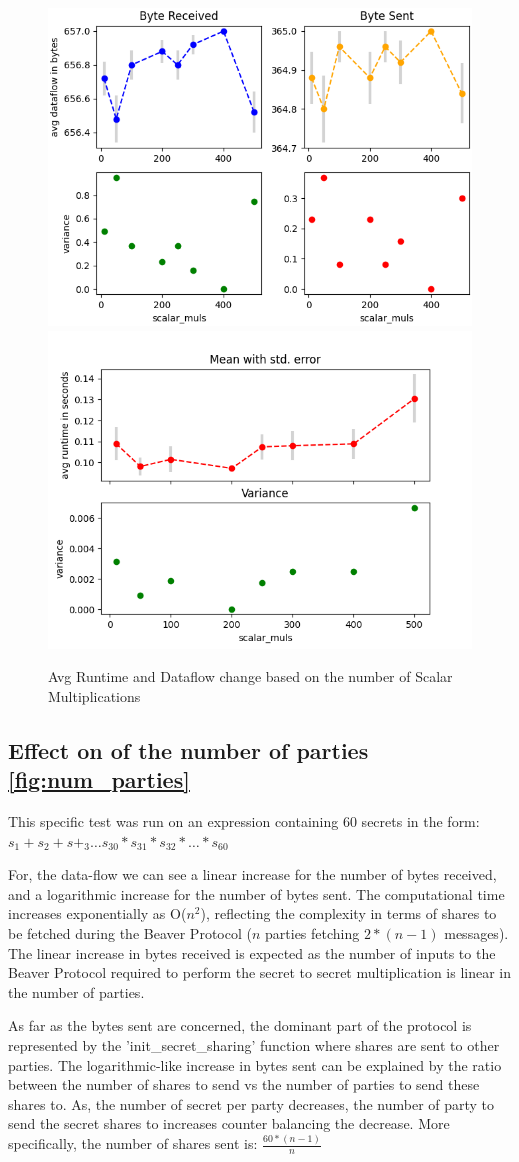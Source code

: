 \documentclass[10pt,conference,compsocconf]{IEEEtran}
\begin{document}
\begin{figure}[h!]
    \centering
    \includegraphics[width=0.49\linewidth]{../performance_analysis/dataflow_scalar_multiplications.png}
    \includegraphics[width=0.49\linewidth]{../performance_analysis/runtime_scalar_multiplications.png}
    \caption{Avg Runtime and Dataflow change based on the number of Scalar Multiplications}
    \label{fig:scalar_mult}
\end{figure}


\subsection{Effect on of the number of parties \ref{fig:num_parties}}
This specific test was run on an expression containing 60 secrets in the form: $s_1 + s_2 + s+_3 \dots s_{30} * s_{31} *
s_{32} * \dots*  s_{60}$

For, the data-flow we can see a linear increase for the number of bytes received, and a logarithmic increase for the
number of bytes sent.
The computational time increases exponentially as O($n^2$), reflecting the complexity in terms of shares to be fetched during the Beaver Protocol ($n$ parties fetching $2*(n-1)$ messages).
The linear increase in bytes received is expected as the number of inputs to the Beaver Protocol  required to perform the secret to secret multiplication is linear in the number of parties.

As far as the bytes sent are concerned, the dominant part of the protocol is represented by the 'init\_secret\_sharing' function where shares are sent to other parties.
The logarithmic-like increase in bytes sent can be explained by the ratio between the number of shares to send vs the
number of parties to send these shares to.
As, the number of secret per party decreases, the number of party to send the secret shares to increases counter balancing
the decrease. More specifically, the number of shares sent is: $\frac{60*(n-1)}{n}$
\end{document}
